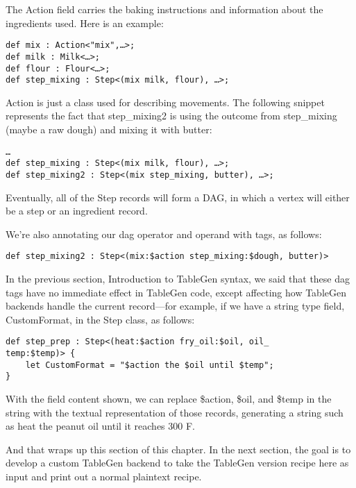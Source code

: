 \begin{enumerate}
The Action field carries the baking instructions and information about the ingredients used. Here is an example:

\begin{lstlisting}[style=styleCXX]
def mix : Action<"mix",…>;
def milk : Milk<…>;
def flour : Flour<…>;
def step_mixing : Step<(mix milk, flour), …>;
\end{lstlisting}

Action is just a class used for describing movements. The following snippet represents the fact that step\_mixing2 is using the outcome from step\_mixing (maybe a raw dough) and mixing it with butter:

\begin{lstlisting}[style=styleCXX]
…
def step_mixing : Step<(mix milk, flour), …>;
def step_mixing2 : Step<(mix step_mixing, butter), …>;
\end{lstlisting}

Eventually, all of the Step records will form a DAG, in which a vertex will either be a step or an ingredient record.

We're also annotating our dag operator and operand with tags, as follows:

\begin{lstlisting}[style=styleCXX]
def step_mixing2 : Step<(mix:$action step_mixing:$dough, butter)>
\end{lstlisting}

In the previous section, Introduction to TableGen syntax, we said that these dag tags have no immediate effect in TableGen code, except affecting how TableGen backends handle the current record—for example, if we have a string type field, CustomFormat, in the Step class, as follows:

\begin{lstlisting}[style=styleCXX]
def step_prep : Step<(heat:$action fry_oil:$oil, oil_
temp:$temp)> {
	let CustomFormat = "$action the $oil until $temp";
}
\end{lstlisting}

With the field content shown, we can replace \$action, \$oil, and \$temp in the string with the textual representation of those records, generating a string such as heat the peanut oil until it reaches 300 F.

\end{enumerate}

And that wraps up this section of this chapter. In the next section, the goal is to develop a custom TableGen backend to take the TableGen version recipe here as input and print out a normal plaintext recipe.




















